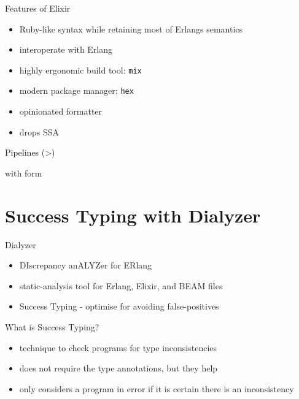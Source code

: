 \documentclass[
  ignorenonframetext,
]{beamer}
\newcommand{\passthrough}[1]{#1}
\providecommand{\tightlist}{%
  \setlength{\itemsep}{0pt}\setlength{\parskip}{0pt}}
\begin{document}
\begin{frame}[fragile]{Features of Elixir}
\protect\hypertarget{features-of-elixir}{}
\begin{itemize}
\tightlist
\item
  Ruby-like syntax while retaining most of Erlang\textquotesingle s
  semantics
\item
  interoperate with Erlang
\item
  highly ergonomic build tool: \passthrough{\lstinline!mix!}
\item
  modern package manager: \passthrough{\lstinline!hex!}
\item
  opinionated formatter
\item
  drops SSA
\end{itemize}
\end{frame}

\begin{frame}{Pipelines (\textbar\textgreater)}
\protect\hypertarget{pipelines}{}
\end{frame}

\begin{frame}{with form}
\protect\hypertarget{with-form}{}
\end{frame}

\hypertarget{success-typing-with-dialyzer}{%
\section{Success Typing with
Dialyzer}\label{success-typing-with-dialyzer}}

\begin{frame}{Dialyzer}
\protect\hypertarget{dialyzer}{}
\begin{itemize}
\tightlist
\item
  DIscrepancy anALYZer for ERlang
\item
  static-analysis tool for Erlang, Elixir, and BEAM files
\item
  Success Typing - optimise for avoiding false-positives
\end{itemize}
\end{frame}

\begin{frame}{What is Success Typing?}
\protect\hypertarget{what-is-success-typing}{}
\begin{itemize}
\tightlist
\item
  technique to check programs for type inconsistencies
\item
  does not require the type annotations, but they help
\item
  only considers a program in error if it is certain there is an
  inconsistency
\end{itemize}
\end{frame}
\end{document}
